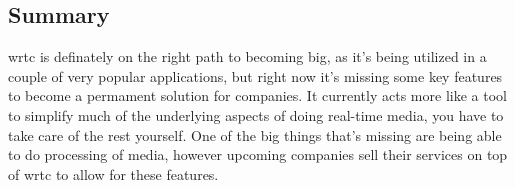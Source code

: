 \subsection*{Summary}
\gls{wrtc} is definately on the right path to becoming big, as it's being utilized in a couple of very popular applications, but right now it's missing some key features to become a permament solution for companies. It currently acts more like a tool to simplify much of the underlying aspects of doing real-time media, you have to take care of the rest yourself. One of the big things that's missing are being able to do processing of media, however upcoming companies sell their services on top of \gls{wrtc} to allow for these features.